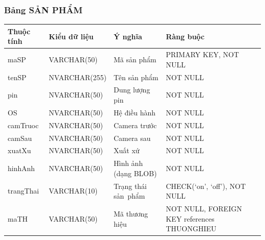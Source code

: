 \documentclass[a4paper,12pt]{report}
\begin{document}
\subsubsection{Bảng SẢN PHẨM}
\noindent
\begin{center}
    \begin{tabular}{|>{\centering\arraybackslash}p{3cm}|
        >{\centering\arraybackslash}p{4cm}|
        >{\centering\arraybackslash}p{4cm}|
        >{\centering\arraybackslash}p{4cm}|}
        \hline
        \textbf{Thuộc tính}                                                                                                               &
        \textbf{Kiểu dữ liệu}                                                                                                                             &
        \textbf{Ý nghĩa}                                                                                                 &
        \textbf{Ràng buộc}                                                                                                         \\
        \hline
        maSP &  VARCHAR(50)  & Mã sản phẩm & PRIMARY KEY, NOT NULL \\
        \hline
        tenSP &  NVARCHAR(255)  & Tên sản phẩm & NOT NULL \\
        \hline
        pin & NVARCHAR(50) & Dung lượng pin & NOT NULL \\                                                                                                                          
        \hline
        OS & NVARCHAR(50) & Hệ điều hành & NOT NULL \\                                                                                                                          
        \hline
        camTruoc & NVARCHAR(50) & Camera trước & NOT NULL \\                                                                                                                          
        \hline
        camSau & NVARCHAR(50) & Camera sau & NOT NULL \\                                                                                                                          
        \hline
        xuatXu & NVARCHAR(50) & Xuất xứ & NOT NULL \\                                                                                                                          
        \hline
        hinhAnh & NVARCHAR(50) & Hình ảnh (dạng BLOB) & NOT NULL \\                                                                                                                          
        \hline
        trangThai &  VARCHAR(10)  & Trạng thái sản~phẩm & CHECK(‘on’, ‘off’), NOT NULL \\
        \hline
        maTH & VARCHAR(50) & Mã thương hiệu & NOT NULL, FOREIGN KEY references THUONGHIEU \\                                                                                                                          
        \hline
    \end{tabular}
\end{center}
\end{document}
